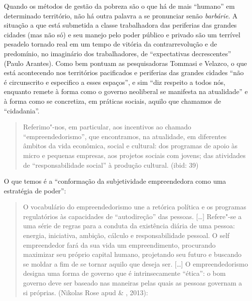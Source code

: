 Quando os métodos de gestão da pobreza são o que há de mais ``humano''
em determinado território, não há outra palavra a se pronunciar senão
\emph{barbárie}. A situação a que está submetida a classe trabalhadora
das periferias das grandes cidades (mas não só) e seu manejo pelo poder
público e privado são um terrível pesadelo tornado real em um tempo de
vitória da contrarrevolução e de predomínio, no imaginário dos
trabalhadores, de ``expectativas decrescentes'' (Paulo Arantes). Como
bem pontuam as pesquisadoras Tommasi e Velazco, o que está acontecendo
nos territórios pacificados e periferias das grandes cidades ``não é
circunscrito e especifico a esses espaços'', e sim ``diz respeito a
todos nós, enquanto remete à forma como o governo neoliberal se
manifesta na atualidade'' e à forma como se concretiza, em práticas
sociais, aquilo que chamamos de ``cidadania''.

\begin{quote}
Referimo"-nos, em particular, aos incentivos ao chamado
``empreendedorismo'', que encontramos, na atualidade, em diferentes
âmbitos da vida econômica, social e cultural: dos programas de apoio às
micro e pequenas empresas, aos projetos sociais com jovens; das
atividades de ``responsabilidade social'' à produção cultural. (ibid:
39)
\end{quote}

O que temos é a ``conformação da subjetividade empreendedora como uma
estratégia de poder'':

\begin{quote}
O vocabulário do empreendedorismo une a retórica política e os programas
regulatórios às capacidades de ``autodireção'' das pessoas. {[}\ldots{}{]}
Refere"-se a uma série de regras para a conduta da existência diária de
uma pessoa: energia, iniciativa, ambição, cálculo e responsabilidade
pessoal. O self empreendedor fará da sua vida um empreendimento,
procurando maximizar seu próprio capital humano, projetando seu futuro e
buscando se moldar a fim de se tornar aquilo que deseja ser. {[}\ldots{}{]} O
empreendedorismo designa uma forma de governo que é intrinsecamente
``ética'': o bom governo deve ser baseado nas maneiras pelas quais as
pessoas governam a si próprias. (Nikolas Rose apud  \& ,
2013):
\end{quote}

